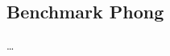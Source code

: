 \subsection{Benchmark Phong}
\label{sec:methodology_experimentmethodology_benchmarkphong}
\ldots



